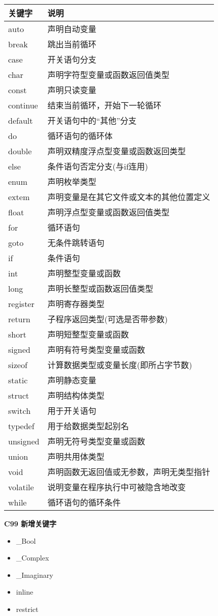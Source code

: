 \documentclass[UTF8]{ctexart}
\begin{document}
	\begin{tabular*}{\linewidth}{l|l}
		\toprule
		关键字 & 说明\\
		\midrule
		auto & 声明自动变量\\
		break & 跳出当前循环 \\
		case & 开关语句分支 \\
		char & 声明字符型变量或函数返回值类型\\
		const & 声明只读变量 \\
		continue & 结束当前循环，开始下一轮循环\\
		default & 开关语句中的“其他”分支\\
		do & 循环语句的循环体 \\
		double & 声明双精度浮点型变量或函数返回类型\\
		else & 条件语句否定分支(与if连用)\\
		enum & 声明枚举类型 \\
		extem & 声明变量是在其它文件或文本的其他位置定义\\
		float & 声明浮点型变量或函数返回值类型\\
		for & 循环语句 \\
		goto & 无条件跳转语句 \\
		if & 条件语句 \\
		int & 声明整型变量或函数 \\
		long & 声明长整型或函数返回值类型\\
		register & 声明寄存器类型 \\
		return & 子程序返回类型(可选是否带参数)\\
		short & 声明短整型变量或函数 \\
		signed & 声明有符号类型变量或函数 \\
		sizeof & 计算数据类型或变量长度(即所占字节数)\\
		static & 声明静态变量 \\
		struct & 声明结构体类型\\
		switch & 用于开关语句 \\
		typedef & 用于给数据类型起别名 \\
		unsigned & 声明无符号类型变量或函数 \\
		union & 声明共用体类型 \\
		void & 声明函数无返回值或无参数，声明无类型指针\\
		volatile & 说明变量在程序执行中可被隐含地改变\\
		while & 循环语句的循环条件\\
		\bottomrule
	\end{tabular*}
	\textbf{C99 新增关键字}
	\begin{framed}
		\begin{itemize}
			\item \_Bool
			\item \_Complex
			\item \_Imaginary
			\item inline
			\item restrict
		\end{itemize}
	\end{framed}
\end{document}
